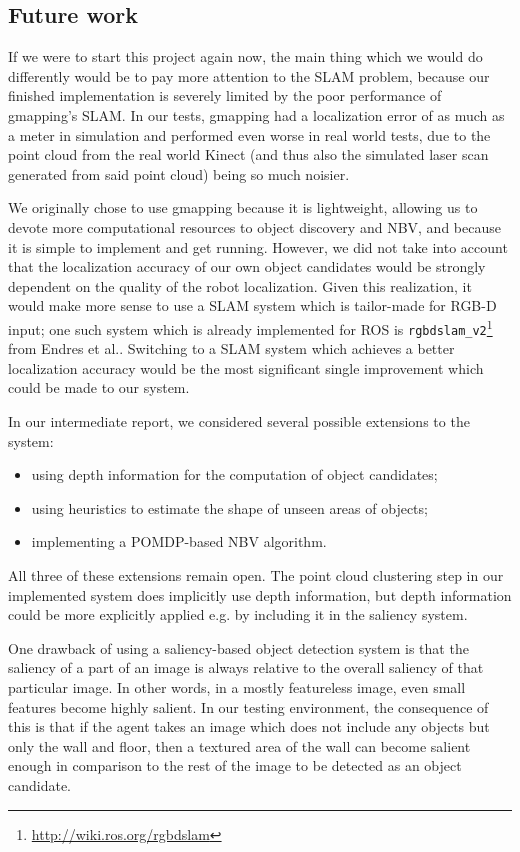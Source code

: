 \subsection{Future work}

If we were to start this project again now, the main thing which we would do differently would be to pay more attention to the SLAM problem, because our finished implementation is severely limited by the poor performance of gmapping's SLAM.
In our tests, gmapping had a localization error of as much as a meter in simulation and performed even worse in real world tests, due to the point cloud from the real world Kinect (and thus also the simulated laser scan generated from said point cloud) being so much noisier.

We originally chose to use gmapping because it is lightweight, allowing us to devote more computational resources to object discovery and NBV, and because it is simple to implement and get running.
However, we did not take into account that the localization accuracy of our own object candidates would be strongly dependent on the quality of the robot localization.
Given this realization, it would make more sense to use a SLAM system which is tailor-made for RGB-D input; one such system which is already implemented for ROS is \texttt{rgbdslam\_v2}\footnote{\url{http://wiki.ros.org/rgbdslam}} from Endres et al.\cite{endres2014rgbdslam}.
Switching to a SLAM system which achieves a better localization accuracy would be the most significant single improvement which could be made to our system.

In our intermediate report, we considered several possible extensions to the system:
\begin{itemize}
	\setlength\itemsep{1pt}
	\item using depth information for the computation of object candidates;
	\item using heuristics to estimate the shape of unseen areas of objects;
	\item implementing a POMDP-based NBV algorithm.
\end{itemize}

All three of these extensions remain open.
The point cloud clustering step in our implemented system does implicitly use depth information, but depth information could be more explicitly applied e.g. by including it in the saliency system.

One drawback of using a saliency-based object detection system is that the saliency of a part of an image is always relative to the overall saliency of that particular image.
In other words, in a mostly featureless image, even small features become highly salient.
In our testing environment, the consequence of this is that if the agent takes an image which does not include any objects but only the wall and floor, then a textured area of the wall can become salient enough in comparison to the rest of the image to be detected as an object candidate.

